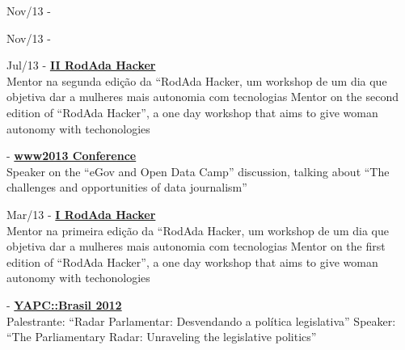 \documentclass[]{friggeri-cv}
\begin{document}
{\footnotesize{Nov/13}} - \href{https://knightcenter.utexas.edu/pt-br/blog/00-14390-inscricoes-abertas-para-primeiro-curso-da-anj-com-o-centro-knight-introducao-ao-jornal}{\textbf{}}\\

{\footnotesize{Nov/13}} - \href{http://2.encontro.dados.gov.br/encontro.html}{\textbf{}}\\

{\footnotesize{Jul/13}} - \href{http://rodadahacker.com/}{\textbf{II RodAda Hacker}}\\
%
{Mentor na segunda edição da ``RodAda Hacker, um workshop de um dia que objetiva dar a mulheres mais autonomia com tecnologias}%
{Mentor on the second edition of ``RodAda Hacker'', a one day workshop that aims to give woman autonomy with techonologies}

{\footnotesize{}} - \href{http://www2013.org/}{\textbf{www2013 Conference}}\\
%
{Speaker on the ``eGov and Open Data Camp'' discussion, talking about ``The challenges and opportunities of data journalism''}

{\footnotesize{Mar/13}} - \href{http://rodadahacker.com/}{\textbf{I RodAda Hacker}}\\
%
{Mentor na primeira edição da ``RodAda Hacker, um workshop de um dia que objetiva dar a mulheres mais autonomia com tecnologias}%
{Mentor on the first edition of ``RodAda Hacker'', a one day workshop that aims to give woman autonomy with techonologies}

{\footnotesize{}} - \href{http://yapcbrasil.org.br/2012/talk/110}{\textbf{YAPC::Brasil 2012}}\\
%
{Palestrante: ``Radar Parlamentar: Desvendando a política legislativa''}%
{Speaker: ``The Parliamentary Radar: Unraveling the legislative politics''}
\end{document}
